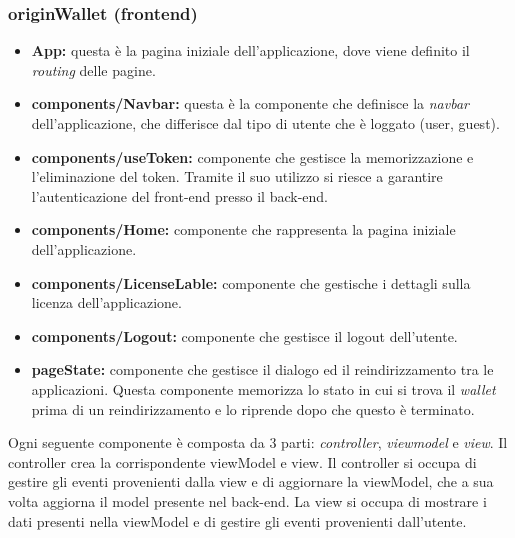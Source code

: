 \subsubsection{originWallet (frontend)}

\begin{itemize}
    \item \textbf{App:} questa è la pagina iniziale dell'applicazione, dove viene definito il \textit{routing} delle pagine.
    \item \textbf{components/Navbar:} questa è la componente che definisce la \textit{navbar} dell'applicazione, che differisce dal tipo di utente che è loggato (user, guest).
    \item \textbf{components/useToken:} componente che gestisce la memorizzazione e l'eliminazione del token. Tramite il suo utilizzo si riesce a garantire l'autenticazione del front-end presso il back-end.
    \item \textbf{components/Home:} componente che rappresenta la pagina iniziale dell'applicazione.
    \item \textbf{components/LicenseLable:} componente che gestische i dettagli sulla licenza dell'applicazione.
    \item \textbf{components/Logout:} componente che gestisce il logout dell'utente.  
    \item \textbf{pageState:} componente che gestisce il dialogo ed il reindirizzamento tra le applicazioni. Questa componente memorizza lo stato in cui si trova il \textit{wallet} prima di un reindirizzamento e lo riprende dopo che questo è terminato.
\end{itemize}

Ogni seguente componente è composta da 3 parti: \textit{controller}, \textit{viewmodel} e \textit{view}. Il controller crea la corrispondente
viewModel e view. Il controller si occupa di gestire gli eventi provenienti dalla view e di aggiornare la viewModel, che a sua volta aggiorna 
il model presente nel back-end. La view si occupa di mostrare i dati presenti nella viewModel e di gestire gli eventi provenienti dall'utente.

